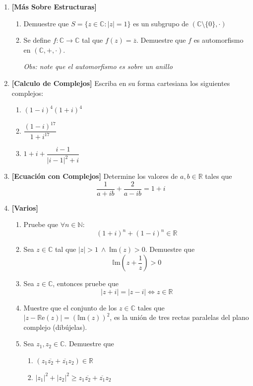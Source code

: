 \documentclass[letterpaper,10pt]{article}
\newcommand{\R}{\mathbb R}
\newcommand{\N}{\mathbb N}
\newcommand{\re}{\mathbb R \text{e}}
\newcommand{\im}{\mathbb I \text{m}}
\newcommand{\C}{\mathbb C}
\newcommand{\ssi}{\Longleftrightarrow} %
\theoremstyle{plain}
\begin{document}
\begin{enumerate}[\bf P1.]
\item \textbf{[Más Sobre Estructuras]}
    \begin{enumerate}
        \item Demuestre que $S= \{z \in \C : |z|=1    \}$ es un subgrupo de $(\C \setminus \{0\}, \cdot)$
        \item Se define $f:\C \to \C$ tal que $f(z)=\overline{z}$. Demuestre que $f$ es automorfismo en $(\C,+,\cdot)$.
        
        \textit{Obs: note que el automorfismo es sobre un anillo}
    \end{enumerate}

\item \textbf{[Calculo de Complejos]} Escriba en su forma cartesiana los siguientes complejos:
    \begin{multicols}{3}
        \begin{enumerate}
            \item $(1-i)^4(1+i)^4$
            \item $\dfrac{(1-i)^{17}}{1+i^{17}}$
            \item $1+i+\dfrac{i-1}{|i-1|^2+i}$
        \end{enumerate}
    \end{multicols}

\item \textbf{[Ecuación con Complejos]} Determine los valores de $a,b \in \R$ tales que
$$ \dfrac{1}{a+ib}+\dfrac{2}{a-ib}=1+i $$

\item \textbf{[Varios]}
    \begin{enumerate}
        \item Pruebe que $\forall n \in \N$:
            $$(1+i)^n+(1-i)^n \in \R$$
        \item Sea $z\in \C$ tal que $|z|>1 ~ \land ~ \im(z)>0$. Demuestre que $$\im(z+\frac{1}{z})>0  $$
        \item Sea $z\in \C$, entonces pruebe que $$ |z+i|=|z-i| \ssi z \in \R $$
        \item Muestre que el conjunto de los $z\in \C$ tales que $|z - \re(z)|=(\im(z))^{2}$, es la unión de tres rectas paralelas del plano complejo (dibújelas).
        \item Sea $z_1,z_2 \in \C$. Demuestre que
            \begin{enumerate}
                \item $(z_1\overline{z_2}+\overline{z_1}z_2)\in \R$
                \item $|z_1|^2+|z_2|^2\geq z_1\overline{z_2}+\overline{z_1}z_2$
            \end{enumerate}
    \end{enumerate}



\end{enumerate}
\end{document}
